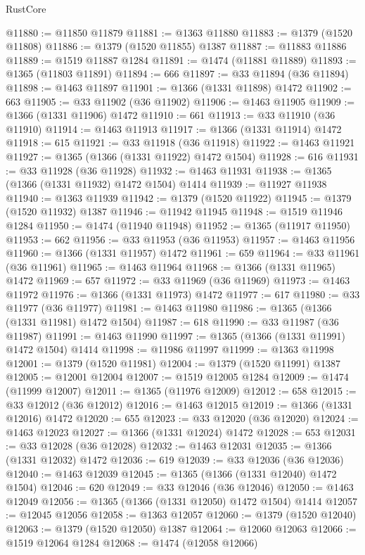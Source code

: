 \begin{lexlean}{RustCore}
\begin{coremodule}
@11880 := @11850 @11879
@11881 := @1363 @11880
@11883 := @1379 (@1520 @11808)
@11886 := @1379 (@1520 @11855) @1387
@11887 := @11883 @11886
@11889 := @1519 @11887 @1284
@11891 := @1474 (@11881 @11889)
@11893 := @1365 (@11803 @11891)
@11894 := 666
@11897 := @33 @11894 (@36 @11894)
@11898 := @1463 @11897
@11901 := @1366 (@1331 @11898) @1472
@11902 := 663
@11905 := @33 @11902 (@36 @11902)
@11906 := @1463 @11905
@11909 := @1366 (@1331 @11906) @1472
@11910 := 661
@11913 := @33 @11910 (@36 @11910)
@11914 := @1463 @11913
@11917 := @1366 (@1331 @11914) @1472
@11918 := 615
@11921 := @33 @11918 (@36 @11918)
@11922 := @1463 @11921
@11927 := @1365 (@1366 (@1331 @11922) @1472 @1504)
@11928 := 616
@11931 := @33 @11928 (@36 @11928)
@11932 := @1463 @11931
@11938 := @1365 (@1366 (@1331 @11932) @1472 @1504) @1414
@11939 := @11927 @11938
@11940 := @1363 @11939
@11942 := @1379 (@1520 @11922)
@11945 := @1379 (@1520 @11932) @1387
@11946 := @11942 @11945
@11948 := @1519 @11946 @1284
@11950 := @1474 (@11940 @11948)
@11952 := @1365 (@11917 @11950)
@11953 := 662
@11956 := @33 @11953 (@36 @11953)
@11957 := @1463 @11956
@11960 := @1366 (@1331 @11957) @1472
@11961 := 659
@11964 := @33 @11961 (@36 @11961)
@11965 := @1463 @11964
@11968 := @1366 (@1331 @11965) @1472
@11969 := 657
@11972 := @33 @11969 (@36 @11969)
@11973 := @1463 @11972
@11976 := @1366 (@1331 @11973) @1472
@11977 := 617
@11980 := @33 @11977 (@36 @11977)
@11981 := @1463 @11980
@11986 := @1365 (@1366 (@1331 @11981) @1472 @1504)
@11987 := 618
@11990 := @33 @11987 (@36 @11987)
@11991 := @1463 @11990
@11997 := @1365 (@1366 (@1331 @11991) @1472 @1504) @1414
@11998 := @11986 @11997
@11999 := @1363 @11998
@12001 := @1379 (@1520 @11981)
@12004 := @1379 (@1520 @11991) @1387
@12005 := @12001 @12004
@12007 := @1519 @12005 @1284
@12009 := @1474 (@11999 @12007)
@12011 := @1365 (@11976 @12009)
@12012 := 658
@12015 := @33 @12012 (@36 @12012)
@12016 := @1463 @12015
@12019 := @1366 (@1331 @12016) @1472
@12020 := 655
@12023 := @33 @12020 (@36 @12020)
@12024 := @1463 @12023
@12027 := @1366 (@1331 @12024) @1472
@12028 := 653
@12031 := @33 @12028 (@36 @12028)
@12032 := @1463 @12031
@12035 := @1366 (@1331 @12032) @1472
@12036 := 619
@12039 := @33 @12036 (@36 @12036)
@12040 := @1463 @12039
@12045 := @1365 (@1366 (@1331 @12040) @1472 @1504)
@12046 := 620
@12049 := @33 @12046 (@36 @12046)
@12050 := @1463 @12049
@12056 := @1365 (@1366 (@1331 @12050) @1472 @1504) @1414
@12057 := @12045 @12056
@12058 := @1363 @12057
@12060 := @1379 (@1520 @12040)
@12063 := @1379 (@1520 @12050) @1387
@12064 := @12060 @12063
@12066 := @1519 @12064 @1284
@12068 := @1474 (@12058 @12066)

\end{coremodule}
\end{lexlean}
